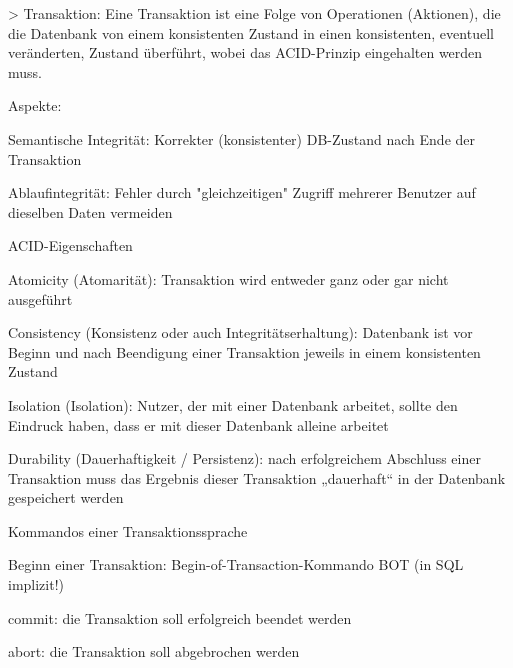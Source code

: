 \documentclass[a4paper]{article}
\begin{document}
\begin{multicols}{3}
\begin{itemize*}
    > Transaktion: Eine Transaktion ist eine Folge von Operationen (Aktionen), die die Datenbank von einem konsistenten Zustand in einen konsistenten, eventuell veränderten, Zustand überführt, wobei das ACID-Prinzip eingehalten werden muss.
    \begin{itemize*}
        \item Aspekte:
        \begin{itemize*}
            \item Semantische Integrität: Korrekter (konsistenter) DB-Zustand nach Ende der Transaktion
            \item Ablaufintegrität: Fehler durch "gleichzeitigen" Zugriff mehrerer Benutzer auf dieselben Daten vermeiden
        \end{itemize*}
        \item ACID-Eigenschaften
        \begin{itemize*}
            \item Atomicity (Atomarität): Transaktion wird entweder ganz oder gar nicht ausgeführt
            \item Consistency (Konsistenz oder auch Integritätserhaltung): Datenbank ist vor Beginn und nach Beendigung einer Transaktion jeweils in einem konsistenten Zustand
            \item Isolation (Isolation): Nutzer, der mit einer Datenbank arbeitet, sollte den Eindruck haben, dass er mit dieser Datenbank alleine arbeitet
            \item Durability (Dauerhaftigkeit / Persistenz): nach erfolgreichem Abschluss einer Transaktion muss das Ergebnis dieser Transaktion „dauerhaft“ in der Datenbank gespeichert werden
        \end{itemize*}
        \item Kommandos einer Transaktionssprache
        \begin{itemize*}
            \item Beginn einer Transaktion: Begin-of-Transaction-Kommando BOT (in SQL implizit!)
            \item commit: die Transaktion soll erfolgreich beendet werden
            \item abort: die Transaktion soll abgebrochen werden
        \end{itemize*}
    \end{itemize*}


\end{itemize*}
\end{multicols}
\end{document}
